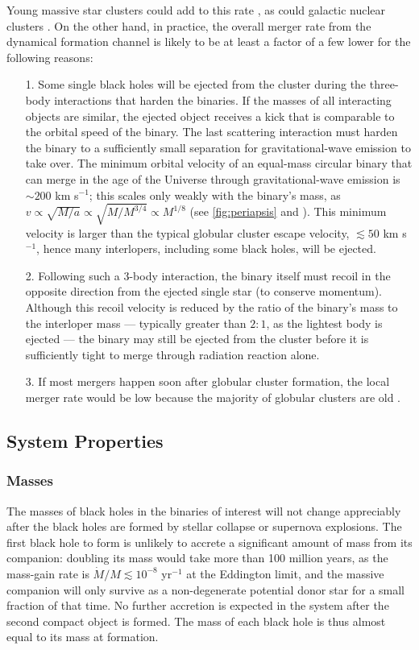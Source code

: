 \documentclass[iop,onecolumn]{revtex4-1}
\begin{document}
Young massive star clusters could add to this rate \citep[e.g.,][]{Ziosi:2014}, as could galactic nuclear clusters \citep[e.g.,][]{MillerLauburg:2008,Bartos:2016,Stone:2016,AntoniniRasio:2016}.  On the other hand, in practice, the overall merger rate from the dynamical formation channel is likely to be at least a factor of a few lower for the following reasons:
\begin{enumerate}
	\item [1.]
Some single black holes will be ejected from the cluster during the three-body interactions that harden the binaries.  If the masses of all interacting objects are similar, the ejected object receives a kick that is comparable to the orbital speed of the binary.  The last scattering interaction must harden the binary to a sufficiently small separation for gravitational-wave emission to take over. The minimum orbital velocity of an equal-mass circular binary that can merge in the age of the Universe through gravitational-wave emission is $\sim 200$ km s$^{-1}$; this scales only weakly with the binary's mass, as $v \propto \sqrt{M/a}  \propto \sqrt{M/M^{3/4}} \propto M^{1/8}$ (see \autoref{fig:periapsis} and \citet{Peters:1964}).   This minimum velocity is larger than the typical globular cluster escape velocity, $\lesssim 50$ km s$^{-1}$, hence many interlopers, including some black holes, will be ejected.
	\item[2.]
Following such a 3-body interaction, the binary itself must recoil in the opposite direction from the ejected single star (to conserve momentum). Although this recoil velocity is reduced by the ratio of the binary's mass to the interloper mass --- typically greater than $2:1$, as the lightest body is ejected --- the binary may still be ejected from the cluster before it is sufficiently tight to merge through radiation reaction alone.
\item[3.] If most mergers happen soon after globular cluster formation, the local merger rate would be low because the majority of globular clusters are old \citep{Rodriguez:2016big}.
\end{enumerate} 

\subsection{System Properties}
\subsubsection{Masses}
The masses of black holes in the binaries of interest will not change appreciably after the black holes are formed by stellar collapse or supernova explosions.  The first black hole to form is unlikely to accrete a significant amount of mass from its companion: doubling its mass would take more than 100 million years, as the mass-gain rate is $\dot{M}/M \lesssim 10^{-8}$ yr$^{-1}$ at the Eddington limit, and the massive companion will only survive as a non-degenerate potential donor star for a small fraction of that time. No further accretion is expected in the system after the second compact object is formed. The mass of each black hole is thus almost equal to its mass at formation. 
\end{document}
